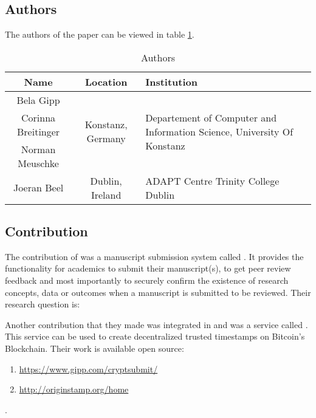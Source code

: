 
\section*{\citet{2017_Gipp}}

\subsection*{Authors}
The authors of the paper can be viewed in table \ref{tab:2017_Gipp_Authors}.
\begin{longtable}{ |c|c|p{5cm}| }
	\caption{Authors} \label{tab:2017_Gipp_Authors} \\
	\hline
 	\cellcolor{Gray}Name & \cellcolor{Gray}Location & \cellcolor{Gray}Institution \\ [0.5ex] 
 	\hline\hline
 	\endhead
	 Bela Gipp &  \multirow{3}{*}{Konstanz, Germany} & \multirow{3}{*}{\parbox{5cm}{\centering Departement of Computer and Information Science, University Of Konstanz}} \\
	 \cline{1-1}
	 Corinna Breitinger &  & \\
	 \cline{1-1}
	 Norman Meuschke &  & \\
	 \hline
	 Joeran Beel & Dublin, Ireland & ADAPT Centre Trinity College Dublin \\
	\hline
\end{longtable}


\subsection*{Contribution}
The contribution of \citet{2017_Gipp} was a manuscript submission system called . It provides the functionality for academics to submit their manuscript(s), to get peer review feedback and most importantly to securely confirm the existence of research concepts, data or outcomes when a manuscript is submitted to be reviewed. Their research question is:
\begin{displayquote}
\end{displayquote}
Another contribution that they made was integrated in  and was a service called . This service can be used to create decentralized trusted timestamps on Bitcoin's Blockchain.
Their work is available open source:
\begin{enumerate}[label={\arabic*)},font={\color{red!50!black}\bfseries}]
	\item {} \url{https://www.gipp.com/cryptsubmit/}
	\item {} \url{http://originstamp.org/home}
\end{enumerate}.

